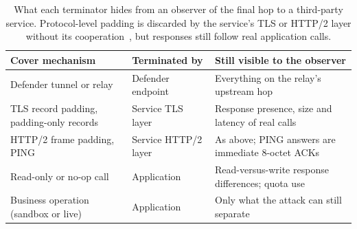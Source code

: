 \begin{table}[t]\centering\footnotesize
\caption{What each terminator hides from an observer of the final hop to a third-party service. Protocol-level padding is discarded by the service's TLS or HTTP/2 layer without its cooperation~\cite{rfc8446,rfc9113}, but responses still follow real application calls.}\label{tab:cover-necessity}
\setlength{\tabcolsep}{3pt}
\begin{tabularx}{\columnwidth}{@{}P{.3\columnwidth}P{.22\columnwidth}Y@{}}\toprule
Cover mechanism & Terminated by & Still visible to the observer \\\midrule
Defender tunnel or relay & Defender endpoint & Everything on the relay's upstream hop \\\addlinespace[2pt]
TLS record padding, padding-only records & Service TLS layer & Response presence, size and latency of real calls \\\addlinespace[2pt]
HTTP/2 frame padding, PING & Service HTTP/2 layer & As above; PING answers are immediate 8-octet ACKs \\\addlinespace[2pt]
Read-only or no-op call & Application & Read-versus-write response differences; quota use \\\addlinespace[2pt]
Business operation (sandbox or live) & Application & Only what the attack can still separate \\\bottomrule
\end{tabularx}\end{table}
